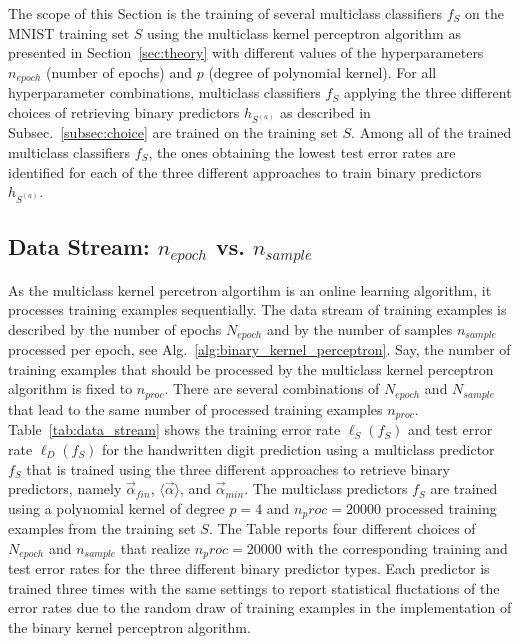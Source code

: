 The scope of this Section is the training of several multiclass classifiers $f_S$ on the MNIST training set $S$ using the multiclass kernel perceptron algorithm as presented in Section~\ref{sec:theory} with different values of the hyperparameters $n_{epoch}$ (number of epochs) and $p$ (degree of polynomial kernel). For all hyperparameter combinations, multiclass classifiers $f_S$ applying the three different choices of retrieving binary predictors $h_{S^{(a)}}$ as described in Subsec.~\ref{subsec:choice} are trained on the training set $S$. Among all of the trained multiclass classifiers $f_S$, the ones obtaining the lowest test error rates are identified for each of the three different approaches to train binary predictors $h_{S^{(a)}}$.

\subsection{Data Stream: $n_{epoch}$ vs. $n_{sample}$}
As the multiclass kernel percetron algortihm is an online learning algorithm, it processes training examples sequentially. The data stream of training examples is described by the number of epochs $N_{epoch}$ and by the number of samples $n_{sample}$ processed per epoch, see Alg.~\ref{alg:binary_kernel_perceptron}. Say, the number of training examples that should be processed by the multiclass kernel perceptron algorithm is fixed to $n_{proc}$. There are several combinations of $N_{epoch}$ and $N_{sample}$ that lead to the same number of processed training examples $n_{proc}$. Table~\ref{tab:data_stream} shows the training error rate $\ell_S(f_S)$ and test error rate $\ell_D(f_S)$ for the handwritten digit prediction using a multiclass predictor $f_S$ that is trained using the three different approaches to retrieve binary predictors, namely $\vec{\alpha}_{fin}$, $\langle \vec{\alpha} \rangle$, and $\vec{\alpha}_{min}$. The multiclass predictors $f_S$ are trained using a polynomial kernel of degree $p=4$ and $n_proc=20000$ processed training examples from the training set $S$. The Table reports four different choices of $N_{epoch}$ and $n_{sample}$ that realize $n_proc=20000$ with the corresponding training and test error rates for the three different binary predictor types. Each predictor is trained three times with the same settings to report statistical fluctations of the error rates due to the random draw of training examples in the implementation of the binary kernel perceptron algorithm. 

